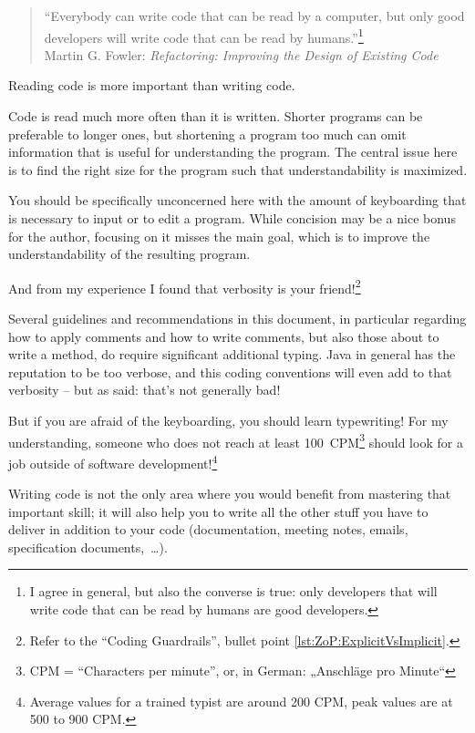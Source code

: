 \documentclass[11pt,a4paper, titlepage, parskip=half, headsepline, footsepline, cleardoublepage=current, headheight=1cm]{scrbook}
\begin{document}
\begin{quotation}
“Everybody can write code that can be read by a computer, but only good developers will write code that can be read by humans.”\footnote{I agree in general, but also the converse is true: only developers that will write code that can be read by humans are good developers.} \\
Martin G. Fowler: \textit{Refactoring: Improving the Design of Existing Code}\autocite{Fowler:Refactoring}
\end{quotation}

Reading code is more important than writing code.\autocite{Marks:LocalVariableTypeInference:ReadingIsMoreImportantThanWriting}

Code is read much more often than it is written. Shorter programs can be preferable to longer ones, but shortening a program too much can omit information that is useful for understanding the program. The central issue here is to find the right size for the program such that understandability is maximized.

You should be specifically unconcerned here with the amount of keyboarding that is necessary to input or to edit a program. While concision may be a nice bonus for the author, focusing on it misses the main goal, which is to improve the understandability of the resulting program.

And from my experience I found that verbosity is your friend!\footnote{Refer to the “Coding Guardrails”, bullet point \ref{lst:ZoP:ExplicitVsImplicit}.}

Several guidelines and recommendations in this document, in particular regarding how to apply comments and how to write comments, but also those about to write a method, do require significant additional typing. Java in general has the reputation to be too verbose, and this coding conventions will even add to that verbosity – but as said: that's not generally bad!

But if you are afraid of the keyboarding, you should learn typewriting! For my understanding, someone who does not reach at least 100~CPM\footnote{CPM = “Characters per minute”, or, in German: „Anschläge pro Minute“} should look for a job outside of software development!\footnote{Average values for a trained typist are around 200 CPM, peak values are at 500 to 900 CPM.}

Writing code is not the only area where you would benefit from mastering that important skill; it will also help you to write all the other stuff you have to deliver in addition to your code (documentation, meeting notes, emails, specification documents,~…).
\end{document}
